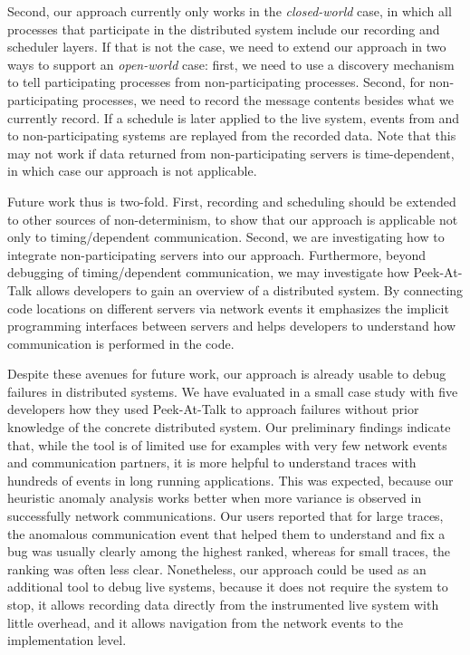 \documentclass[preprint,3p]{elsarticle}
\newcommand{\toolname}{Peek-At-Talk\xspace}
\begin{document}
Second, our approach currently only works in the \emph{closed-world} case, in
which all processes that participate in the distributed system include our
recording and scheduler layers. If that is not the case, we need to extend our
approach in two ways to support an \emph{open-world} case: first, we need to use
a discovery mechanism to tell participating processes from non-participating
processes. Second, for non-participating processes, we need to record the
message contents besides what we currently record. If a schedule is later
applied to the live system, events from and to non-participating systems are
replayed from the recorded data. Note that this may not work if data returned
from non-participating servers is time-dependent, in which case our approach is
not applicable.

Future work thus is two-fold. First, recording and scheduling should be extended
to other sources of non-determinism, to show that our approach is applicable not
only to timing\-/dependent communication. Second, we are investigating how to
integrate non-participating servers into our approach. Furthermore, beyond
debugging of timing\-/dependent communication, we may investigate how \toolname
allows developers to gain an overview of a distributed system. By connecting
code locations on different servers via network events it emphasizes the
implicit programming interfaces between servers and helps developers to
understand how communication is performed in the code.

Despite these avenues for future work, our approach is already usable to debug
failures in distributed systems. We have evaluated in a small case study with
five developers how they used \toolname to approach failures without prior
knowledge of the concrete distributed system. Our preliminary findings indicate
that, while the tool is of limited use for examples with very few network events
and communication partners, it is more helpful to understand traces with
hundreds of events in long running applications. This was expected, because our
heuristic anomaly analysis works better when more variance is observed in
successfully network communications. Our users reported that for large traces,
the anomalous communication event that helped them to understand and fix a bug
was usually clearly among the highest ranked, whereas for small traces, the
ranking was often less clear. Nonetheless, our approach could be used as an
additional tool to debug live systems, because it does not require the system to
stop, it allows recording data directly from the instrumented live system with
little overhead, and it allows navigation from the network events to the
implementation level.
\end{document}

